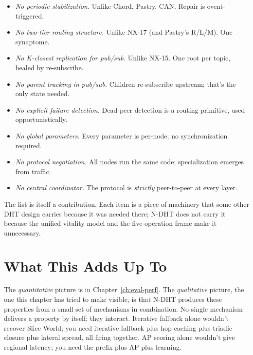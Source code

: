 \documentclass[twoside,nobib]{tufte-book}
\newcommand{\NDHT}{N-DHT\xspace}
\begin{document}
\begin{itemize}\setlength\itemsep{0.15em}
  \item \emph{No periodic stabilization.} Unlike Chord, Pastry,
    CAN. Repair is event-triggered.
  \item \emph{No two-tier routing structure.} Unlike NX-17 (and
    Pastry's R/L/M). One synaptome.
  \item \emph{No K-closest replication for pub/sub.} Unlike
    NX-15. One root per topic, healed by re-subscribe.
  \item \emph{No parent tracking in pub/sub.} Children
    re-subscribe upstream; that's the only state needed.
  \item \emph{No explicit failure detection.} Dead-peer detection
    is a routing primitive, used opportunistically.
  \item \emph{No global parameters.} Every parameter is per-node;
    no synchronization required.
  \item \emph{No protocol negotiation.} All nodes run the same
    code; specialization emerges from traffic.
  \item \emph{No central coordinator.} The protocol is
    \emph{strictly} peer-to-peer at every layer.
\end{itemize}

The list is itself a contribution. Each item is a piece of
machinery that some other DHT design carries because it was
needed there; \NDHT does not carry it because the unified
vitality model and the five-operation frame make it
unnecessary.

\section{What This Adds Up To}

The \emph{quantitative} picture is in
Chapter~\ref{ch:eval-perf}. The \emph{qualitative} picture, the
one this chapter has tried to make visible, is that \NDHT
produces these properties from a small set of mechanisms in
combination. No single mechanism delivers a property by
itself; they interact. Iterative fallback alone wouldn't
recover Slice World; you need iterative fallback plus hop
caching plus triadic closure plus lateral spread, all firing
together. AP scoring alone wouldn't give regional latency; you
need the prefix plus AP plus learning.
\end{document}
